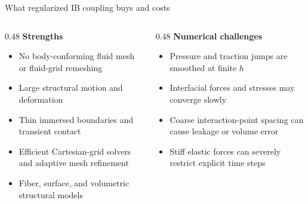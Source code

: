 \documentclass[aspectratio=169,11pt]{beamer}
\begin{document}
\begin{frame}{What regularized IB coupling buys and costs}
\begin{columns}[T,onlytextwidth]
\begin{column}{0.48\textwidth}
\textbf{Strengths}
\begin{itemize}\itemsep3pt
  \item No body-conforming fluid mesh or fluid-grid remeshing
  \item Large structural motion and deformation
  \item Thin immersed boundaries and transient contact
  \item Efficient Cartesian-grid solvers and adaptive mesh refinement
  \item Fiber, surface, and volumetric structural models
\end{itemize}
\end{column}
\begin{column}{0.48\textwidth}
\textbf{Numerical challenges}
\begin{itemize}\itemsep3pt
  \item Pressure and traction jumps are smoothed at finite $h$
  \item Interfacial forces and stresses may converge slowly
  \item Coarse interaction-point spacing can cause leakage or volume error
  \item Stiff elastic forces can severely restrict explicit time steps
\end{itemize}
\end{column}
\end{columns}
\medskip
{}
\end{frame}
\end{document}

